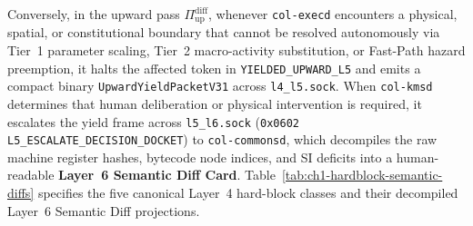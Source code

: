 Conversely, in the upward pass $\Pi_{\mathrm{up}}^{\mathrm{diff}}$, whenever \texttt{col-execd}
encounters a physical, spatial, or constitutional boundary that cannot be resolved
autonomously via Tier~1 parameter scaling, Tier~2 macro-activity substitution, or Fast-Path
hazard preemption, it halts the affected token in \texttt{YIELDED\_UPWARD\_L5} and emits a
compact binary \texttt{UpwardYieldPacketV31} across \texttt{l4\_l5.sock}. When \texttt{col-kmsd}
determines that human deliberation or physical intervention is required, it escalates the
yield frame across \texttt{l5\_l6.sock} (\texttt{0x0602 L5\_ESCALATE\_DECISION\_DOCKET}) to
\texttt{col-commonsd}, which decompiles the raw machine register hashes, bytecode node
indices, and SI deficits into a human-readable \textbf{Layer~6 Semantic Diff Card}.
Table~\ref{tab:ch1-hardblock-semantic-diffs} specifies the five canonical Layer~4 hard-block
classes and their decompiled Layer~6 Semantic Diff projections.

